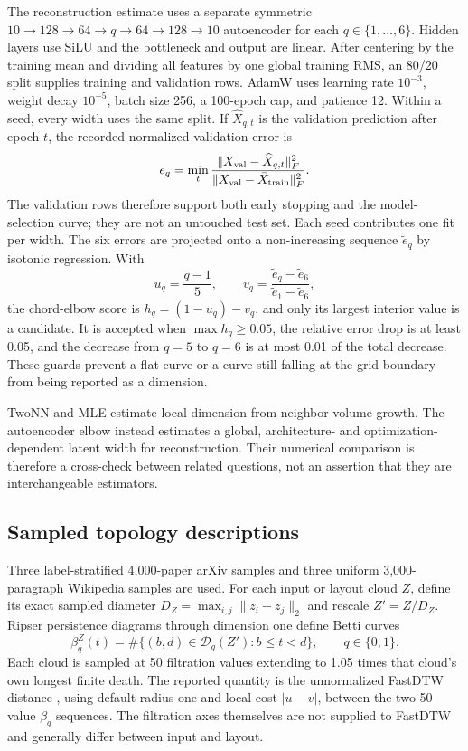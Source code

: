 \documentclass[10pt]{article}
\begin{document}
The reconstruction estimate uses a separate symmetric
$10\!\to\!128\!\to\!64\!\to\!q\!\to\!64\!\to\!128\!\to\!10$ autoencoder for each
$q\in\{1,\ldots,6\}$.  Hidden layers use SiLU and the bottleneck and output are linear.
After centering by the training mean and dividing all features by one global training
RMS, an 80/20 split supplies training and validation rows.  AdamW uses learning rate
$10^{-3}$, weight decay $10^{-5}$, batch size 256, a 100-epoch cap, and patience 12.
Within a seed, every width uses the same split.  If $\widehat X_{q,t}$ is the validation
prediction after epoch $t$, the recorded normalized validation error is
\begin{equation}
 e_q=\min_t\frac{\|X_{\rm val}-\widehat X_{q,t}\|_F^2}
                  {\|X_{\rm val}-\bar X_{\rm train}\|_F^2}.
 \label{eq:ae-id-nmse}
\end{equation}
The validation rows therefore support both early stopping and the model-selection curve;
they are not an untouched test set.  Each seed contributes one fit per width.  The six
errors are projected onto a
non-increasing sequence $\widetilde e_q$ by isotonic regression.  With
\[
 u_q=\frac{q-1}{5},\qquad
 v_q=\frac{\widetilde e_q-\widetilde e_6}{\widetilde e_1-\widetilde e_6},
\]
the chord-elbow score is $h_q=(1-u_q)-v_q$, and only its largest interior value is a
candidate.  It is accepted when $\max h_q\ge0.05$, the relative error drop is at least
0.05, and the decrease from $q=5$ to $q=6$ is at most 0.01 of the total decrease.  These
guards prevent a flat curve or a curve still falling at the grid boundary from being
reported as a dimension.

TwoNN and MLE estimate local dimension from neighbor-volume growth.  The autoencoder
elbow instead estimates a global, architecture- and optimization-dependent latent width
for reconstruction.  Their numerical comparison is therefore a cross-check between
related questions, not an assertion that they are interchangeable estimators.

\subsection{Sampled topology descriptions}

Three label-stratified 4,000-paper arXiv samples and three uniform 3,000-paragraph
Wikipedia samples are used.  For each input or layout cloud $Z$, define its exact sampled
diameter $D_Z=\max_{i,j}\|z_i-z_j\|_2$ and rescale $Z'=Z/D_Z$.  Ripser persistence
diagrams \cite{ripser} through dimension one define Betti curves
\begin{equation}
 \beta_q^Z(t)=\#\{(b,d)\in\mathcal D_q(Z'):b\le t<d\},\qquad q\in\{0,1\}.
\label{eq:betti}
\end{equation}
Each cloud is sampled at 50 filtration values extending to 1.05 times that cloud's own
longest finite death.  The reported quantity is the unnormalized FastDTW distance
\cite{fastdtw}, using
default radius one and local cost $|u-v|$, between the two 50-value $\beta_q$ sequences.
The filtration axes themselves are not supplied to FastDTW and generally differ between
input and layout.
\end{document}
